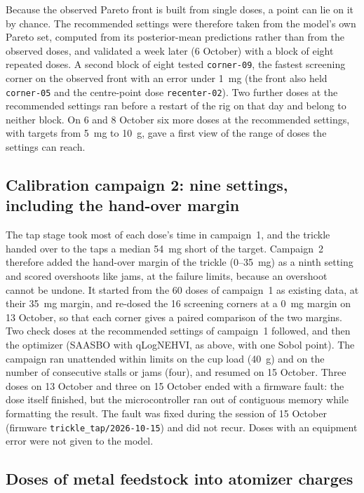 \documentclass[preprint,12pt]{elsarticle}
\begin{document}
Because the observed Pareto front is built from single doses, a point can lie on it by chance. The recommended settings were therefore taken from the model's own Pareto set, computed from its posterior-mean predictions rather than from the observed doses, and validated a week later (6 October) with a block of eight repeated doses. A second block of eight tested \texttt{corner-09}, the fastest screening corner on the observed front with an error under 1~mg (the front also held \texttt{corner-05} and the centre-point dose \texttt{recenter-02}). Two further doses at the recommended settings ran before a restart of the rig on that day and belong to neither block. On 6 and 8 October six more doses at the recommended settings, with targets from 5~mg to 10~g, gave a first view of the range of doses the settings can reach.

\subsection{Calibration campaign 2: nine settings, including the hand-over margin}
\label{sec:margin}

The tap stage took most of each dose's time in campaign~1, and the trickle handed over to the taps a median 54~mg short of the target. Campaign~2 therefore added the hand-over margin of the trickle (0--35~mg) as a ninth setting and scored overshoots like jams, at the failure limits, because an overshoot cannot be undone. It started from the 60 doses of campaign~1 as existing data, at their 35~mg margin, and re-dosed the 16 screening corners at a 0~mg margin on 13 October, so that each corner gives a paired comparison of the two margins. Two check doses at the recommended settings of campaign~1 followed, and then the optimizer (SAASBO with qLogNEHVI, as above, with one Sobol point). The campaign ran unattended within limits on the cup load (40~g) and on the number of consecutive stalls or jams (four), and resumed on 15 October. Three doses on 13 October and three on 15 October ended with a firmware fault: the dose itself finished, but the microcontroller ran out of contiguous memory while formatting the result. The fault was fixed during the session of 15 October (firmware \texttt{trickle\_tap/2026-10-15}) and did not recur. Doses with an equipment error were not given to the model.

\subsection{Doses of metal feedstock into atomizer charges}
\label{sec:production}
\end{document}
